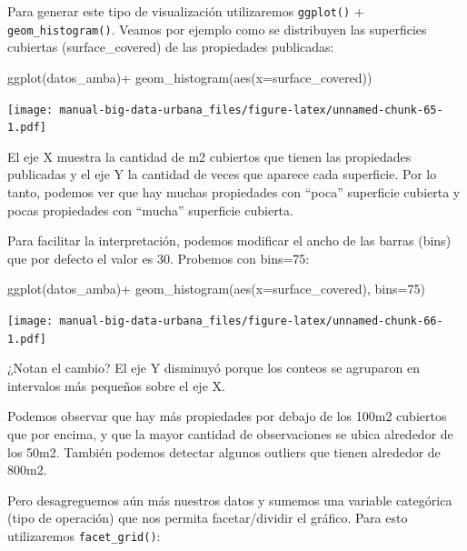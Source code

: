 \documentclass[
  spanish,
]{book}
\newenvironment{Shaded}{\begin{snugshade}}{\end{snugshade}}
\newcommand{\AttributeTok}[1]{\textcolor[rgb]{0.77,0.63,0.00}{#1}}
\newcommand{\DecValTok}[1]{\textcolor[rgb]{0.00,0.00,0.81}{#1}}
\newcommand{\FunctionTok}[1]{\textcolor[rgb]{0.00,0.00,0.00}{#1}}
\newcommand{\NormalTok}[1]{#1}
\newcommand{\SpecialCharTok}[1]{\textcolor[rgb]{0.00,0.00,0.00}{#1}}
\begin{document}
Para generar este tipo de visualización utilizaremos \texttt{ggplot()} + \texttt{geom\_histogram()}. Veamos por ejemplo como se distribuyen las superficies cubiertas (surface\_covered) de las propiedades publicadas:

\begin{Shaded}
\begin{Highlighting}[]
\FunctionTok{ggplot}\NormalTok{(datos\_amba)}\SpecialCharTok{+}
  \FunctionTok{geom\_histogram}\NormalTok{(}\FunctionTok{aes}\NormalTok{(}\AttributeTok{x=}\NormalTok{surface\_covered))}
\end{Highlighting}
\end{Shaded}

\texttt{[image: manual-big-data-urbana\_files/figure-latex/unnamed-chunk-65-1.pdf]}

El eje X muestra la cantidad de m2 cubiertos que tienen las propiedades publicadas y el eje Y la cantidad de veces que aparece cada superficie. Por lo tanto, podemos ver que hay muchas propiedades con ``poca'' superficie cubierta y pocas propiedades con ``mucha'' superficie cubierta.

Para facilitar la interpretación, podemos modificar el ancho de las barras (bins) que por defecto el valor es 30. Probemos con bins=75:

\begin{Shaded}
\begin{Highlighting}[]
\FunctionTok{ggplot}\NormalTok{(datos\_amba)}\SpecialCharTok{+}
  \FunctionTok{geom\_histogram}\NormalTok{(}\FunctionTok{aes}\NormalTok{(}\AttributeTok{x=}\NormalTok{surface\_covered), }\AttributeTok{bins=}\DecValTok{75}\NormalTok{)}
\end{Highlighting}
\end{Shaded}

\texttt{[image: manual-big-data-urbana\_files/figure-latex/unnamed-chunk-66-1.pdf]}

¿Notan el cambio? El eje Y disminuyó porque los conteos se agruparon en intervalos más pequeños sobre el eje X.

Podemos observar que hay más propiedades por debajo de los 100m2 cubiertos que por encima, y que la mayor cantidad de observaciones se ubica alrededor de los 50m2. También podemos detectar algunos outliers que tienen alrededor de 800m2.

Pero desagreguemos aún más nuestros datos y sumemos una variable categórica (tipo de operación) que nos permita facetar/dividir el gráfico. Para esto utilizaremos \texttt{facet\_grid()}:
\end{document}
